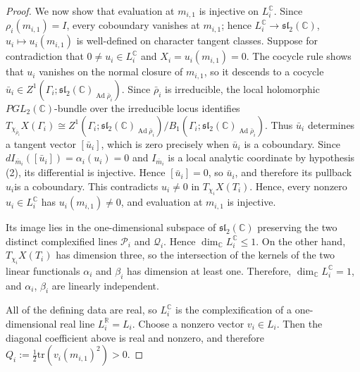 \documentclass{article}
\newcommand{\Ad}{\operatorname{Ad}}
\newcommand{\sltwo}{\mathfrak{sl}_2}
\theoremstyle{plain}
\theoremstyle{definition}
\theoremstyle{plain}
\theoremstyle{plain}
\theoremstyle{plain}
\theoremstyle{remark}
\theoremstyle{remark}
\theoremstyle{plain}
\theoremstyle{plain}
\theoremstyle{plain}
\theoremstyle{plain}
\begin{document}
\begin{proof}
\medskip
	
We now show that evaluation at $m_{i,1}$ is injective on $L_i^{\mathbb C}$. Since $\rho_i(m_{i,1}) = I$, every coboundary vanishes at $m_{i, 1}$; hence $L_i^{\mathbb C} \to \sltwo(\mathbb C)$, $u_i \mapsto u_i(m_{i, 1})$ is well-defined on character tangent classes. Suppose for contradiction that $0 \neq u_i \in L_i^{\mathbb C}$ and $X_i = u_i(m_{i, 1}) = 0$. The cocycle rule shows that $u_i$ vanishes on the normal closure of $m_{i, 1}$, so it descends to a cocycle $\bar u_i \in Z^1(\Gamma_i; \sltwo(\mathbb C)_{\Ad\bar\rho_i})$. Since $\bar\rho_i$ is irreducible, the local holomorphic $PGL_2(\mathbb C)$-bundle over the irreducible locus identifies $T_{\chi_{\bar\rho_i}}X(\Gamma_i) \cong Z^1(\Gamma_i; \sltwo(\mathbb C)_{\Ad\bar\rho_i})/B_1(\Gamma_i; \sltwo(\mathbb C)_{\Ad\bar\rho_i})$. Thus $\bar u_i$ determines a tangent vector $[\bar u_i]$, which is zero precisely when $\bar u_i$ is a coboundary. Since $dI_{\bar m_i}([\bar u_i]) = \alpha_i(u_i) = 0$ and $I_{\bar m_i}$ is a local analytic coordinate by hypothesis (2), its differential is injective. Hence $[\bar u_i] = 0$, so $\bar u_i$, and therefore its pullback $u_i$is a coboundary. This contradicts $u_i \neq 0$ in $T_{\chi_i}X(T_i)$. Hence, every nonzero $u_i \in L_i^{\mathbb C}$ has $u_i(m_{i, 1}) \neq 0$, and evaluation at $m_{i, 1}$ is injective.

\medskip

Its image lies in the one-dimensional subspace of $\sltwo(\mathbb C)$ preserving the two distinct complexified lines $\mathcal P_i$ and $\mathcal Q_i$. Hence $\dim_{\mathbb C}L_i^{\mathbb C} \leq 1$. On the other hand, $T_{\chi_i}X(T_i)$ has dimension three, so the intersection of the kernels of the two linear functionals $\alpha_i$ and $\beta_i$ has dimension at least one. Therefore, $\dim_{\mathbb C}L_i^{\mathbb C} = 1$, and $\alpha_i$, $\beta_i$ are linearly independent.

\medskip

All of the defining data are real, so $L_i^{\mathbb C}$ is the complexification of a one-dimensional real line $L_i^{\mathbb R} = L_i$. Choose a nonzero vector $v_i \in L_i$. Then the diagonal coefficient above is real and nonzero, and therefore $Q_i := \frac12\mathrm{tr}(v_i(m_{i, 1})^2) > 0$.

\medskip


\end{proof}
\end{document}
